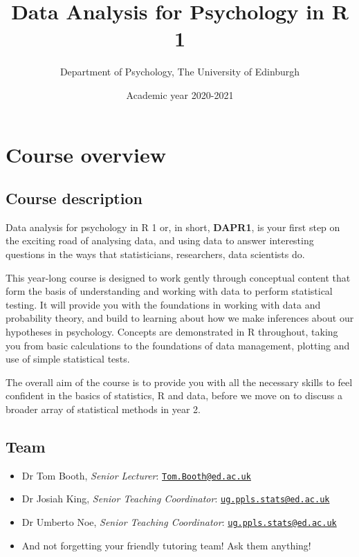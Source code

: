 \documentclass[]{book}
\title{ Data Analysis for Psychology in R 1}
\author{Department of Psychology, The University of Edinburgh}
\date{Academic year 2020-2021}
\providecommand{\tightlist}{%
  \setlength{\itemsep}{0pt}\setlength{\parskip}{0pt}}
\begin{document}
\maketitle

{
\setcounter{tocdepth}{1}
\tableofcontents
}
\hypertarget{chap-overview}{%
\chapter*{Course overview}\label{chap-overview}}

\hypertarget{course-description}{%
\section*{Course description}\label{course-description}}

Data analysis for psychology in R 1 or, in short, \textbf{DAPR1}, is your first step on the exciting road of analysing data, and using data to answer interesting questions in the ways that statisticians, researchers, data scientists do.

This year-long course is designed to work gently through conceptual content that form the basis of understanding and working with data to perform statistical testing. It will provide you with the foundations in working with data and probability theory, and build to learning about how we make inferences about our hypotheses in psychology. Concepts are demonstrated in R throughout, taking you from basic calculations to the foundations of data management, plotting and use of simple statistical tests.

The overall aim of the course is to provide you with all the necessary skills to feel confident in the basics of statistics, R and data, before we move on to discuss a broader array of statistical methods in year 2.

\hypertarget{team}{%
\section*{Team}\label{team}}

\begin{itemize}
\tightlist
\item
  Dr Tom Booth, \emph{Senior Lecturer}: \href{mailto:Tom.Booth@ed.ac.uk}{\nolinkurl{Tom.Booth@ed.ac.uk}}
\item
  Dr Josiah King, \emph{Senior Teaching Coordinator}: \href{mailto:ug.ppls.stats@ed.ac.uk}{\nolinkurl{ug.ppls.stats@ed.ac.uk}}
\item
  Dr Umberto Noe, \emph{Senior Teaching Coordinator}: \href{mailto:ug.ppls.stats@ed.ac.uk}{\nolinkurl{ug.ppls.stats@ed.ac.uk}}
\item
  And not forgetting your friendly tutoring team! Ask them anything!
\end{itemize}
\end{document}
